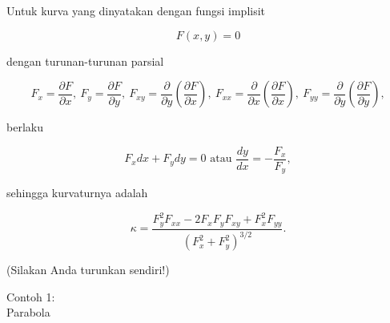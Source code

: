 \documentclass[12pt,arial,letterpaper]{book}
\begin{document}
\begin{eulercomment}
\begin{eulercomment}
\begin{eulercomment}
\begin{eulercomment}
\begin{eulercomment}
\begin{eulercomment}
\begin{eulercomment}
\begin{eulercomment}
\begin{eulercomment}
\begin{eulercomment}
\begin{eulercomment}
\begin{eulercomment}
\begin{eulercomment}
\begin{eulercomment}
\begin{eulercomment}
\begin{eulercomment}
\begin{eulercomment}
\begin{eulercomment}
\begin{eulercomment}
\begin{eulercomment}
\begin{eulercomment}
\begin{eulercomment}
\begin{eulercomment}
Untuk kurva yang dinyatakan dengan fungsi implisit

\end{eulercomment}
\begin{eulerformula}
\[
F(x,y)=0
\]
\end{eulerformula}
\begin{eulercomment}
dengan turunan-turunan parsial

\end{eulercomment}
\begin{eulerformula}
\[
F_x=\frac{\partial F}{\partial x},\ F_y=\frac{\partial F}{\partial y},\ F_{xy}=\frac{\partial}{\partial y}\left(\frac{\partial F}{\partial x}\right),\ F_{xx}=\frac{\partial}{\partial x}\left(\frac{\partial F}{\partial x}\right),\ F_{yy}=\frac{\partial}{\partial y}\left(\frac{\partial F}{\partial y}\right),
\]
\end{eulerformula}
\begin{eulercomment}
berlaku

\end{eulercomment}
\begin{eulerformula}
\[
F_x dx+ F_y dy = 0\text{ atau } \frac{dy}{dx}=-\frac{F_x}{F_y},
\]
\end{eulerformula}
\begin{eulercomment}
sehingga kurvaturnya adalah

\end{eulercomment}
\begin{eulerformula}
\[
\kappa =\frac {F_y^2F_{xx}-2F_xF_yF_{xy}+F_x^2F_{yy}}{\left(F_x^2+F_y^2\right)^{3/2}}.
\]
\end{eulerformula}
\begin{eulercomment}
(Silakan Anda turunkan sendiri!)

Contoh 1:\\
Parabola


\end{eulercomment}
\end{eulercomment}
\end{eulercomment}
\end{eulercomment}
\end{eulercomment}
\end{eulercomment}
\end{eulercomment}
\end{eulercomment}
\end{eulercomment}
\end{eulercomment}
\end{eulercomment}
\end{eulercomment}
\end{eulercomment}
\end{eulercomment}
\end{eulercomment}
\end{eulercomment}
\end{eulercomment}
\end{eulercomment}
\end{eulercomment}
\end{eulercomment}
\end{eulercomment}
\end{eulercomment}
\end{eulercomment}
\end{document}
